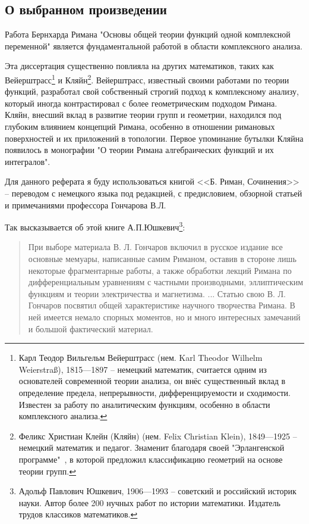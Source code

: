\documentclass[a4paper,12pt]{article}
\theoremstyle{remark}
\begin{document}
\subsection{О выбранном произведении}

Работа Бернхарда Римана "Основы общей теории функций одной комплексной переменной" \cite{Dissertation}
является фундаментальной работой в области комплексного анализа.

Эта диссертация существенно повлияла на других математиков, таких
как Вейерштрасс\footnote{
  Карл Теодор Вильгельм Вейерштрасс (нем. Karl Theodor Wilhelm Weierstraß), 1815—1897 --
  немецкий математик, считается одним из основателей современной
  теории анализа, он внёс существенный вклад в определение предела, непрерывности, дифференцируемости и сходимости.
  Известен за работу по аналитическим функциям, особенно в области комплексного анализа.
} и Кляйн\footnote{
  Феликс Христиан Клейн (Кляйн) (нем. Felix Christian Klein), 1849—1925 --
  немецкий математик и педагог. Знаменит благодаря своей
  "Эрлангенской программе"\ , в которой предложил классификацию
  геометрий на основе теории групп.
}. Вейерштрасс, известный своими работами по теории функций,
разработал свой собственный строгий подход к комплексному анализу,
который иногда контрастировал с более геометрическим подходом Римана\cite{Contrasts}.
Кляйн, внесший вклад в развитие теории групп и геометрии, находился под
глубоким влиянием концепций Римана, особенно в отношении римановых
поверхностей и их приложений в топологии. Первое упоминание
бутылки Кляйна появилось в монографии "О теории Римана
алгебраических функций и их интегралов"\cite{Klein}.

Для данного реферата я буду использоваться книгой <<Б. Риман, Сочинения>> \cite{Essays} --
переводом с немецкого языка под редакцией, с предисловием, обзорной статьей
и примечаниями профессора Гончарова В.Л.

Так высказывается об этой книге А.П.Юшкевич\footnote{
  Адольф Павлович Юшкевич, 1906—1993 --
  советский и российский историк науки. Автор более 200 нучных работ
  по истории математики. Издатель трудов классиков математиков.
}:
\begin{quotation}
  При выборе материала В. Л. Гончаров включил в русское издание все основные
  мемуары, написанные самим Риманом, оставив в стороне лишь некоторые
  фрагментарные работы, а также обработки лекций Римана по дифференциальным
  уравнениям с частными производными, эллиптическим функциям и теории электричества и магнетизма. ...
  Статью свою В. Л. Гончаров посвятил общей характеристике научного
  творчества Римана. В ней имеется немало спорных моментов, но
  и много интересных замечаний и большой фактический материал.
\end{quotation}
\end{document}
